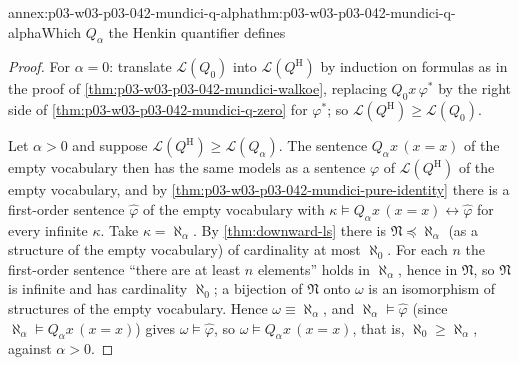 \begin{annexitem}{annex:p03-w03-p03-042-mundici-q-alpha}{thm:p03-w03-p03-042-mundici-q-alpha}{Which \(Q_\alpha\) the Henkin quantifier defines}
\begin{proof}
For \(\alpha=0\): translate \(\mathscr L(Q_0)\) into \(\mathscr
L(Q^{\mathrm H})\) by induction on formulas as in the proof of
\cref{thm:p03-w03-p03-042-mundici-walkoe}, replacing \(Q_0x\,\varphi^\ast\)
by the right side of \cref{thm:p03-w03-p03-042-mundici-q-zero} for
\(\varphi^\ast\); so \(\mathscr L(Q^{\mathrm H})\geq\mathscr L(Q_0)\).

Let \(\alpha>0\) and suppose \(\mathscr L(Q^{\mathrm H})\geq\mathscr
L(Q_\alpha)\).  The sentence \(Q_\alpha x\,(x=x)\) of the empty vocabulary
then has the same models as a sentence \(\varphi\) of \(\mathscr
L(Q^{\mathrm H})\) of the empty vocabulary, and by
\cref{thm:p03-w03-p03-042-mundici-pure-identity} there is a first-order
sentence \(\hat\varphi\) of the empty vocabulary with
\(\kappa\models Q_\alpha x\,(x=x)\leftrightarrow\hat\varphi\) for every
infinite \(\kappa\).  Take \(\kappa=\aleph_\alpha\).  By
\cref{thm:downward-ls} there is \(\mathfrak N\preccurlyeq\aleph_\alpha\) (as
a structure of the empty vocabulary) of cardinality at most \(\aleph_0\).
For each \(n\) the first-order sentence ``there are at least \(n\)
elements'' holds in \(\aleph_\alpha\), hence in \(\mathfrak N\), so
\(\mathfrak N\) is infinite and has cardinality \(\aleph_0\); a bijection
of \(\mathfrak N\) onto \(\omega\) is an isomorphism of structures of the
empty vocabulary.  Hence \(\omega\equiv\aleph_\alpha\), and
\(\aleph_\alpha\models\hat\varphi\) (since
\(\aleph_\alpha\models Q_\alpha x\,(x=x)\)) gives \(\omega\models
\hat\varphi\), so \(\omega\models Q_\alpha x\,(x=x)\), that is,
\(\aleph_0\geq\aleph_\alpha\), against \(\alpha>0\).
\end{proof}
\end{annexitem}

